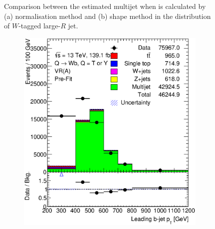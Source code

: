 \begin{figure}[hbt!]
\begin{subfigure}{.35\textwidth}
		\caption{}
		\label{fig:abcd:correctionfactor:bin:ljet_pt}
	\end{subfigure}
	\caption{Comparison between the estimated multijet when \R is calculated by (a) normalisation method and (b) shape method in the \pt distribution of $W$-tagged large-$R$ jet.}
	\label{fig:abcd:correctionfactor:ljet_pt}
\end{figure}


\begin{figure}[hbt!]
	\centering
	\begin{subfigure}{.35\textwidth}
		\centering
		\includegraphics[width=\linewidth,height=\textheight,keepaspectratio]{figs/chapter5/prefitintegral/VR_B_jet_pt.eps}
		\caption{}
		\label{fig:abcd:correctionfactor:integral:jet_pt}
	\end{subfigure}\hspace{0.6cm}
	\begin{subfigure}{.35\textwidth}
		\centering

\end{subfigure}
\end{figure}

